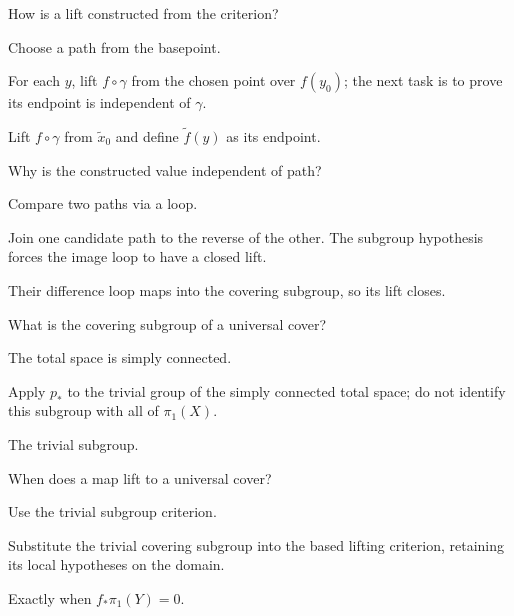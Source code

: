 \begin{exercise}\label{exr:viii11-11}
How is a lift constructed from the criterion?
\end{exercise}
\begin{hint}
Choose a path from the basepoint.

For each \(y\), lift \(f\circ\gamma\) from the chosen point over \(f(y_0)\); the next task is to prove its endpoint is independent of \(\gamma\).
\end{hint}
\begin{solution}
Lift \(f\circ\gamma\) from \(\tilde x_0\) and define \(\widetilde f(y)\) as its endpoint.
\end{solution}

\begin{exercise}\label{exr:viii11-12}
Why is the constructed value independent of path?
\end{exercise}
\begin{hint}
Compare two paths via a loop.

Join one candidate path to the reverse of the other. The subgroup hypothesis forces the image loop to have a closed lift.
\end{hint}
\begin{solution}
Their difference loop maps into the covering subgroup, so its lift closes.
\end{solution}

\begin{exercise}\label{exr:viii11-13}
What is the covering subgroup of a universal cover?
\end{exercise}
\begin{hint}
The total space is simply connected.

Apply \(p_*\) to the trivial group of the simply connected total space; do not identify this subgroup with all of \(\pi_1(X)\).
\end{hint}
\begin{solution}
The trivial subgroup.
\end{solution}

\begin{exercise}\label{exr:viii11-14}
When does a map lift to a universal cover?
\end{exercise}
\begin{hint}
Use the trivial subgroup criterion.

Substitute the trivial covering subgroup into the based lifting criterion, retaining its local hypotheses on the domain.
\end{hint}
\begin{solution}
Exactly when \(f_*\pi_1(Y)=0\).
\end{solution}

